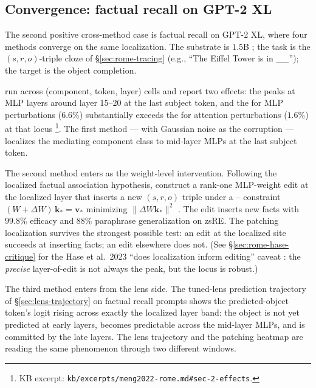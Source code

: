 \subsection{Convergence: factual recall on GPT-2 XL}
\label{sec:cross-rome}

The second positive cross-method case is factual recall on GPT-2 XL,
where four methods converge on the same localization. The substrate
is $1.5$B ; the task is the
$(s, r, o)$-triple cloze of \S\ref{sec:rome-tracing} (e.g., ``The
Eiffel Tower is in \_\_''); the target is the object completion.

\citet{meng2022-rome} run  across (component, token,
layer) cells and report two effects: the 
peaks at MLP layers around layer 15--20 at the last subject token,
and the  for MLP perturbations ($6.6\%$) substantially exceeds
the  for attention perturbations ($1.6\%$) at that locus
\citep[\S 2.3]{meng2022-rome}\footnote{KB excerpt:
\nolinkurl{kb/excerpts/meng2022-rome.md#sec-2-effects}.}. The first
method ---  with Gaussian noise as the corruption
--- localizes the mediating component class to mid-layer MLPs at the
last subject token.

The second method enters as the weight-level intervention. Following
the localized factual association hypothesis,
\citeauthor{meng2022-rome} construct a rank-one MLP-weight edit at
the localized layer that inserts a new $(s, r, o)$ triple under a
-- constraint
$(W + \Delta W)\,\mathbf{k}_* = \mathbf{v}_*$ minimizing
$\|\Delta W \mathbf{k}_*\|^2$ \citep[\S 3.2]{meng2022-rome}. The
edit inserts new facts with $99.8\%$ efficacy and $88\%$ paraphrase
generalization on zsRE. The patching localization survives the
strongest possible test: an edit at the localized site succeeds at
inserting facts; an edit elsewhere does not. (See
\S\ref{sec:rome-hase-critique} for the Hase et al.\ 2023 ``does
localization inform editing'' caveat
:
the \emph{precise} layer-of-edit is not always the  peak, but
the locus is robust.)

The third method enters from the lens side. The tuned-lens
prediction trajectory of \S\ref{sec:lens-trajectory} on factual
recall prompts shows the predicted-object token's logit rising
across exactly the localized layer band: the object is not yet
predicted at early layers, becomes predictable across the mid-layer
MLPs, and is committed by the late layers. The lens trajectory and
the patching heatmap are reading the same phenomenon through two
different windows.

